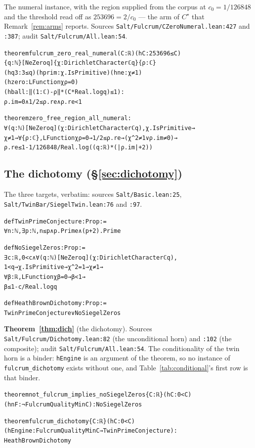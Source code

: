 \documentclass{CUP-JNL-FMP}
\newcommand{\leaninline}[1]{{\small\texttt{#1}}}
\theoremstyle{remark}
\begin{document}
\noindent The numeral instance, with the region supplied from the corpus at
$c_0 = 1/126848$ and the threshold read off as $253696 = 2/c_0$ --- the arm of
$C^\star$ that Remark~\ref{rem:arms} reports. Sources
\leaninline{Salt/Fulcrum/CZeroNumeral.lean:427} and \leaninline{:387}; audit
\leaninline{Salt/Fulcrum/All.lean:54}.
{\footnotesize\begin{alltt}
theorem fulcrum_zero_real_numeral (C : ℝ) (hC : 253696 ≤ C)
    \{q : ℕ\} [NeZero q] \{χ : DirichletCharacter ℂ q\} \{ρ : ℂ\}
    (hq3 : 3 ≤ q) (hprim : χ.IsPrimitive) (hne : χ ≠ 1)
    (hzero : LFunction χ ρ = 0)
    (hball : ‖(1 : ℂ) - ρ‖ * (C * Real.log q) ≤ 1) :
    ρ.im = 0 ∧ 1 / 2 ≤ ρ.re ∧ ρ.re < 1

theorem zero_free_region_all_numeral :
    ∀ (q : ℕ) [NeZero q] (χ : DirichletCharacter ℂ q), χ.IsPrimitive →
      χ ≠ 1 → ∀ \{ρ : ℂ\}, LFunction χ ρ = 0 → 1 / 2 ≤ ρ.re → (χ ^ 2 ≠ 1 ∨ ρ.im ≠ 0) →
        ρ.re ≤ 1 - 1 / 126848 / Real.log ((q : ℝ) * (|ρ.im| + 2))
\end{alltt}}

\subsection{The dichotomy (\S\ref{sec:dichotomy})}

\medskip\noindent The three targets, verbatim: sources
\leaninline{Salt/Basic.lean:25}, \leaninline{Salt/TwinBar/SiegelTwin.lean:76}
and \leaninline{:97}.
{\footnotesize\begin{alltt}
def TwinPrimeConjecture : Prop :=
  ∀ n : ℕ, ∃ p : ℕ, n ≤ p ∧ p.Prime ∧ (p + 2).Prime

def NoSiegelZeros : Prop :=
  ∃ c : ℝ, 0 < c ∧ ∀ (q : ℕ) [NeZero q] (χ : DirichletCharacter ℂ q),
    1 < q → χ.IsPrimitive → χ ^ 2 = 1 → χ ≠ 1 →
    ∀ β : ℝ, LFunction χ β = 0 → β < 1 →
      β ≤ 1 - c / Real.log q

def HeathBrownDichotomy : Prop :=
  TwinPrimeConjecture ∨ NoSiegelZeros
\end{alltt}}

\medskip\noindent\textbf{Theorem~\ref{thm:dich}} (the dichotomy). Sources
\leaninline{Salt/Fulcrum/Dichotomy.lean:82} (the unconditional horn) and
\leaninline{:102} (the composite); audit \leaninline{Salt/Fulcrum/All.lean:54}.
The conditionality of the twin horn is a binder: \leaninline{hEngine} is an
argument of the theorem, so no instance of \leaninline{fulcrum\_dichotomy} exists
without one, and Table~\ref{tab:conditional}'s first row is that binder.
{\footnotesize\begin{alltt}
theorem not_fulcrum_implies_noSiegelZeros \{C : ℝ\} (hC : 0 < C)
    (hnF : ¬ FulcrumQualityMin C) : NoSiegelZeros

theorem fulcrum_dichotomy \{C : ℝ\} (hC : 0 < C)
    (hEngine : FulcrumQualityMin C → TwinPrimeConjecture) :
    HeathBrownDichotomy
\end{alltt}}
\end{document}
